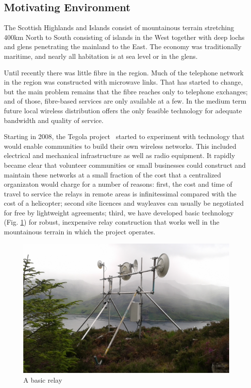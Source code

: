 \subsection{Motivating Environment}
The Scottish Highlands and Islands consist of mountainous terrain
stretching 400km North to South consisting of islands in the West
together with deep lochs and glens penetrating the mainland to the
East.  The economy was traditionally maritime, and nearly all
habitation is at sea level or in the glens.

Until recently there was little fibre in the region.  Much of the
telephone network in the region was constructed with microwave
links. That has started to change, but the main problem remains that
the fibre reaches only to telephone exchanges; and of those,
fibre-based services are only available at a few. In the medium term
future local wireless distribution offers the only feasible technology
for adequate bandwidth and quality of service.

Starting in 2008, the Tegola project~\cite{tegola} started to
experiment with technology that would enable communities to build
their own wireless networks. This included electrical
and mechanical infrastructure as well as radio equipment.  It
rapidly became clear that volunteer communities or small businesses
could construct and maintain these networks at a small fraction of the
cost that a centralized organizaton would charge for a number of
reasons: first, the cost and time of travel to service the relays in
remote areas is infinitessimal compared with the cost of a helicopter;
second site licences and wayleaves can usually be negotiated for free
by lightweight agreements; third, we have developed basic technology
(Fig. \ref{fig:mhialairigh}) for robust, inexpensive relay
construction that works well in the mountainous terrain in which the
project operates.
\begin{figure}[h]
\centering
 \includegraphics[width=\columnwidth]{figs/mhialairigh-from-behind}
 \caption{A basic relay}
\label{fig:mhialairigh}
\end{figure}

